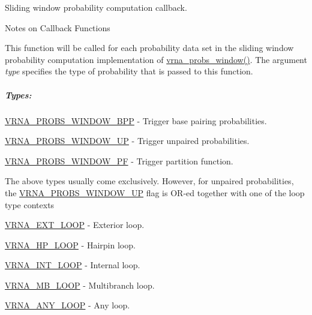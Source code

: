 Sliding window probability computation callback. 

\begin{DoxyRefDesc}{Notes on Callback Functions}
\item[\mbox{\hyperlink{callbacks__callbacks000005}{Notes on Callback Functions}}]This function will be called for each probability data set in the sliding window probability computation implementation of \mbox{\hyperlink{group__part__func__window_ga7115d012988541a65ec323c5f17a334b}{vrna\+\_\+probs\+\_\+window()}}. The argument {\itshape type} specifies the type of probability that is passed to this function. \end{DoxyRefDesc}


\subparagraph*{Types\+:}


\begin{DoxyItemize}
\item \mbox{\hyperlink{group__part__func__window_ga296217b76e76e5f7e6927e7210aa9b1f}{V\+R\+N\+A\+\_\+\+P\+R\+O\+B\+S\+\_\+\+W\+I\+N\+D\+O\+W\+\_\+\+B\+PP}} -\/ Trigger base pairing probabilities.
\item \mbox{\hyperlink{group__part__func__window_ga18325811c7dfc7b7d9d4ac37f4353615}{V\+R\+N\+A\+\_\+\+P\+R\+O\+B\+S\+\_\+\+W\+I\+N\+D\+O\+W\+\_\+\+UP}} -\/ Trigger unpaired probabilities.
\item \mbox{\hyperlink{group__part__func__window_ga4b79137d9b28b1f9cac7983792ce34a0}{V\+R\+N\+A\+\_\+\+P\+R\+O\+B\+S\+\_\+\+W\+I\+N\+D\+O\+W\+\_\+\+PF}} -\/ Trigger partition function.
\end{DoxyItemize}

The above types usually come exclusively. However, for unpaired probabilities, the \mbox{\hyperlink{group__part__func__window_ga18325811c7dfc7b7d9d4ac37f4353615}{V\+R\+N\+A\+\_\+\+P\+R\+O\+B\+S\+\_\+\+W\+I\+N\+D\+O\+W\+\_\+\+UP}} flag is O\+R-\/ed together with one of the loop type contexts


\begin{DoxyItemize}
\item \mbox{\hyperlink{group__part__func__window_gaf0bb577130090f6c856d1358804250bf}{V\+R\+N\+A\+\_\+\+E\+X\+T\+\_\+\+L\+O\+OP}} -\/ Exterior loop.
\item \mbox{\hyperlink{group__part__func__window_ga30170811c320f3a7b23ffff3b3343b91}{V\+R\+N\+A\+\_\+\+H\+P\+\_\+\+L\+O\+OP}} -\/ Hairpin loop.
\item \mbox{\hyperlink{group__part__func__window_ga956a237e7d956b684b7d593cb3eca665}{V\+R\+N\+A\+\_\+\+I\+N\+T\+\_\+\+L\+O\+OP}} -\/ Internal loop.
\item \mbox{\hyperlink{group__part__func__window_gad905b71f02b3799eb84b490435aec837}{V\+R\+N\+A\+\_\+\+M\+B\+\_\+\+L\+O\+OP}} -\/ Multibranch loop.
\item \mbox{\hyperlink{group__part__func__window_ga1fef1ad234755db78ab6b695edce5080}{V\+R\+N\+A\+\_\+\+A\+N\+Y\+\_\+\+L\+O\+OP}} -\/ Any loop.
\end{DoxyItemize}

